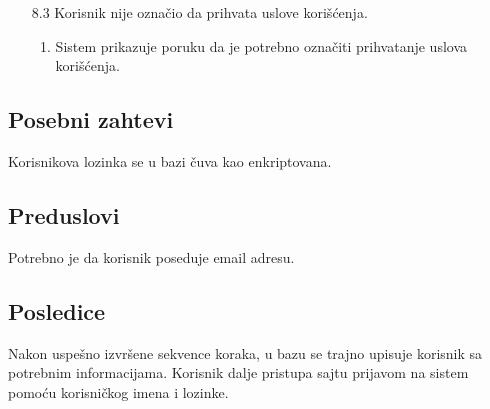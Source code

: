 \documentclass[a4paper,12pt]{report}
\begin{document}
\begin{enumerate}
        \item[8.3] Korisnik nije označio da prihvata uslove korišćenja.
         \begin{enumerate}[noitemsep,topsep=-8pt]
            \item Sistem prikazuje poruku da je potrebno označiti prihvatanje uslova korišćenja.
        \end{enumerate}
    \end{enumerate}
    
\subsection{Posebni zahtevi}
    Korisnikova lozinka se u bazi čuva kao enkriptovana.
\subsection{Preduslovi}
    Potrebno je da korisnik poseduje email adresu. 
\subsection{Posledice}
    Nakon uspešno izvršene sekvence koraka, u bazu se trajno upisuje korisnik sa potrebnim informacijama. Korisnik dalje pristupa sajtu prijavom na sistem pomoću korisničkog imena i lozinke.
\end{document}
